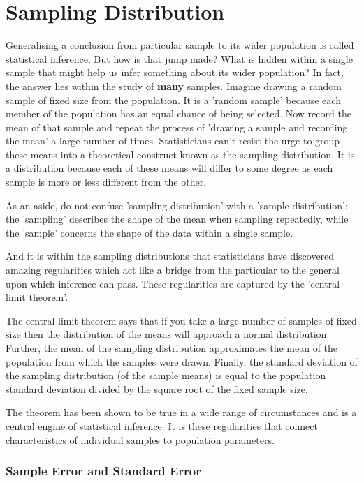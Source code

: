 \documentclass[a4paper,twosided,notoc]{tufte-book}
\begin{document}
\chapter{Sampling Distribution}
Generalising a conclusion from particular sample to its wider population is called statistical inference. But how is that jump made? What is hidden within a single sample that might help us infer something about its wider population? In fact, the answer lies within the study of \textbf{many} samples. Imagine drawing a random sample of fixed size from the population. It is a 'random sample' because each member of the population has an equal chance of being selected. Now record the mean  of that sample and repeat the process of 'drawing a sample and recording the mean' a large number of times. Statisticians can't resist the urge to group these means into a theoretical construct known as the sampling distribution. It is a distribution because each of these means will differ to some degree as each sample is more or less different from the other.

As an aside, do not confuse 'sampling distribution' with a 'sample distribution': the 'sampling' describes the shape of the mean when sampling repeatedly, while the 'sample' concerns the shape of the data within a single sample.

And it is within the sampling distributions that statisticians have discovered amazing regularities which act like a bridge from the particular to the general upon which inference can pass. These regularities are captured by the 'central limit theorem'.

The central limit theorem says that if you take a large number of samples of fixed size then the distribution of the means will approach a normal distribution. Further, the mean of the sampling distribution approximates the mean of the population from which the samples were drawn. Finally, the standard deviation of the sampling distribution (of the sample means) is equal to the population standard deviation divided by the square root of the fixed sample size.

The theorem has been shown to be true in a wide range of circumstances and is a central engine of statistical inference. It is these regularities that connect characteristics of individual samples to population parameters.

\subsection{Sample Error and Standard Error}
\end{document}
